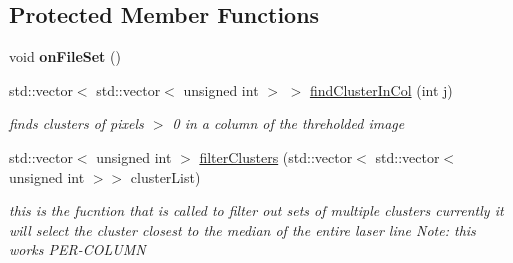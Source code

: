 \subsection*{Protected Member Functions}
\begin{DoxyCompactItemize}
\item 
void {\bfseries on\+File\+Set} ()\hypertarget{classLaserLoadImage_a8823ec67ba386ed13602b9ec7647cd45}{}\label{classLaserLoadImage_a8823ec67ba386ed13602b9ec7647cd45}

\item 
std\+::vector$<$ std\+::vector$<$ unsigned int $>$ $>$ \hyperlink{classLaserLoadImage_ab8290a8c7d2eb46979b7e09f5293102a}{find\+Cluster\+In\+Col} (int j)
\begin{DoxyCompactList}\small\item\em finds clusters of pixels $>$ 0 in a column of the threholded image \end{DoxyCompactList}\item 
std\+::vector$<$ unsigned int $>$ \hyperlink{classLaserLoadImage_a52449eec749ada197fe003cc3a84d4ac}{filter\+Clusters} (std\+::vector$<$ std\+::vector$<$ unsigned int $>$$>$ cluster\+List)
\begin{DoxyCompactList}\small\item\em this is the fucntion that is called to filter out sets of multiple clusters currently it will select the cluster closest to the median of the entire laser line Note\+: this works P\+E\+R-\/\+C\+O\+L\+U\+MN \end{DoxyCompactList}\end{DoxyCompactItemize}
